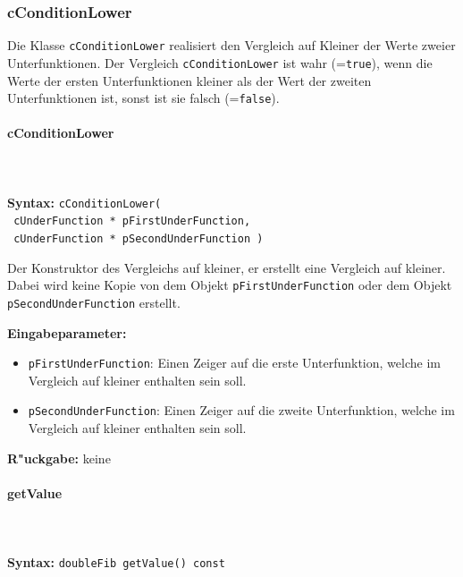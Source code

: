 \subsubsection{cConditionLower}

Die Klasse \verb|cConditionLower| realisiert den Vergleich auf Kleiner der Werte zweier Unterfunktionen. Der Vergleich \verb|cConditionLower| ist wahr (=\verb|true|), wenn die Werte der ersten Unterfunktionen kleiner als der Wert der zweiten Unterfunktionen ist, sonst ist sie falsch  (=\verb|false|).


\paragraph{cConditionLower}

\ \\\\\noindent
\textbf{Syntax:} \verb|cConditionLower(| \\\verb| cUnderFunction * pFirstUnderFunction,| \\\verb| cUnderFunction * pSecondUnderFunction )|

\bigskip\noindent
Der Konstruktor des Vergleichs auf kleiner, er erstellt eine Vergleich auf kleiner. Dabei wird keine Kopie von  dem Objekt \verb|pFirstUnderFunction| oder dem Objekt \verb|pSecondUnderFunction| erstellt.

\bigskip\noindent
\textbf{Eingabeparameter:}
\begin{itemize}
 \item \verb|pFirstUnderFunction|: Einen Zeiger auf die erste Unterfunktion, welche im Vergleich auf kleiner enthalten sein soll.
 \item \verb|pSecondUnderFunction|: Einen Zeiger auf die zweite Unterfunktion, welche im Vergleich auf kleiner enthalten sein soll.
\end{itemize}

\bigskip\noindent
\textbf{R"uckgabe:} keine


\paragraph{getValue}

\ \\\\\noindent
\textbf{Syntax:} \verb|doubleFib getValue() const|


